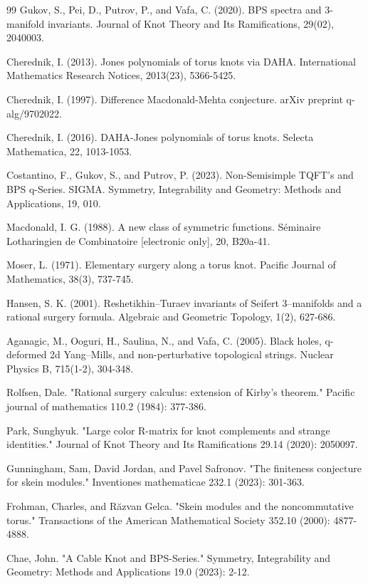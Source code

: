\documentclass{article}
\numberwithin{corollary}{theorem}
\numberwithin{corollary}{proposition}
\begin{document}
\begin{thebibliography}{99}
Gukov, S., Pei, D., Putrov, P., and Vafa, C. (2020). BPS spectra and 3-manifold invariants. Journal of Knot Theory and Its Ramifications, 29(02), 2040003.



Cherednik, I. (2013). Jones polynomials of torus knots via DAHA. International Mathematics Research Notices, 2013(23), 5366-5425.

Cherednik, I. (1997). Difference Macdonald-Mehta conjecture. arXiv preprint q-alg/9702022.

Cherednik, I. (2016). DAHA-Jones polynomials of torus knots. Selecta Mathematica, 22, 1013-1053.



Costantino, F., Gukov, S., and Putrov, P. (2023). Non-Semisimple TQFT's and BPS q-Series. SIGMA. Symmetry, Integrability and Geometry: Methods and Applications, 19, 010.

Macdonald, I. G. (1988). A new class of symmetric functions. Séminaire Lotharingien de Combinatoire [electronic only], 20, B20a-41.

Moser, L. (1971). Elementary surgery along a torus knot. Pacific Journal of Mathematics, 38(3), 737-745.

Hansen, S. K. (2001). Reshetikhin–Turaev invariants of Seifert 3–manifolds and a rational surgery formula. Algebraic and Geometric Topology, 1(2), 627-686.

Aganagic, M., Ooguri, H., Saulina, N., and Vafa, C. (2005). Black holes, q-deformed 2d Yang–Mills, and non-perturbative topological strings. Nuclear Physics B, 715(1-2), 304-348.

Rolfsen, Dale. "Rational surgery calculus: extension of Kirby’s theorem." Pacific journal of mathematics 110.2 (1984): 377-386.

Park, Sunghyuk. "Large color R-matrix for knot complements and strange identities." Journal of Knot Theory and Its Ramifications 29.14 (2020): 2050097.

Gunningham, Sam, David Jordan, and Pavel Safronov. "The finiteness conjecture for skein modules." Inventiones mathematicae 232.1 (2023): 301-363.

Frohman, Charles, and Răzvan Gelca. "Skein modules and the noncommutative torus." Transactions of the American Mathematical Society 352.10 (2000): 4877-4888.

Chae, John. "A Cable Knot and BPS-Series." Symmetry, Integrability and Geometry: Methods and Applications 19.0 (2023): 2-12.


\end{thebibliography}
\end{document}
